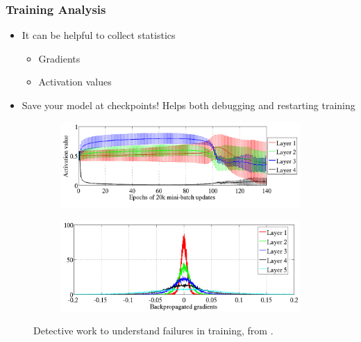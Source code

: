 \documentclass[10pt,mathserif]{beamer}
\begin{document}
\begin{frame}
  \frametitle{Training Analysis}
  \begin{itemize}
  \item It can be helpful to collect statistics
    \begin{itemize}
    \item Gradients
    \item Activation values
    \end{itemize}
  \item Save your model at checkpoints! Helps both debugging and restarting
    training
  \end{itemize}
  \begin{figure}[ht]
    \centering
    \begin{subfigure}{.5\paperwidth}
      \centering
      \includegraphics[width=0.4\paperwidth]{figure/activation_evolution}
    \end{subfigure}
    \begin{subfigure}{.5\paperwidth}
      \centering
      \includegraphics[width=0.4\paperwidth]{figure/backprop_histogram}
    \end{subfigure}
    \caption{Detective work to understand failures in training, from
      \citep{glorot2010understanding}.\label{fig:detective_work} }
  \end{figure}
\end{frame}
\end{document}
